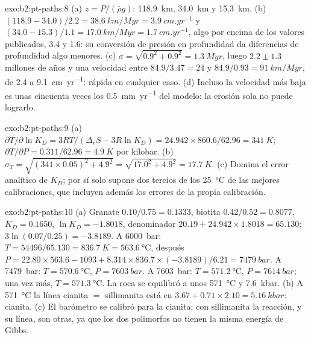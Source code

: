 \begin{solution}{exo:b2:pt-paths:8}
(a) $z = P/(\bar\rho g)$: \qty{118.9}{km}, \qty{34.0}{km} y \qty{15.3}{km}.
(b) $(118.9 - 34.0)/2.2 = \qty{38.6}{km/Myr} = \qty{3.9}{cm.yr^{-1}}$ y $(34.0 -
15.3)/1.1 = \qty{17.0}{km/Myr} = \qty{1.7}{cm.yr^{-1}}$, algo por encima de los valores publicados,
3.4 y 1.6: su conversión de presión en profundidad da diferencias de profundidad algo
menores. (c) $\sigma = \sqrt{0.9^2 + 0.9^2} = \qty{1.3}{Myr}$, luego $2.2 \pm 1.3$
millones de años y una velocidad entre $84.9/3.47 = 24$ y $84.9/0.93 = \qty{91}{km/Myr}$,
de 2.4 a \qty{9.1}{cm.yr^{-1}}: rápida en cualquier caso. (d) Incluso la velocidad más baja es unas cincuenta veces
los \qty{0.5}{mm.yr^{-1}} del modelo: la erosión sola no puede lograrlo.
\end{solution}

\begin{solution}{exo:b2:pt-paths:9}
(a) $\partial T/\partial\ln K_D = 3RT/(\Delta_r S - 3R\ln K_D) = 24.942\times860.6/62.96 =
\qty{341}{K}$; $\partial T/\partial P = 0.311/62.96 = \qty{4.9}{K}$ por kilobar.
(b) $\sigma_T = \sqrt{(341\times0.05)^2 + 4.9^2} = \sqrt{17.0^2 + 4.9^2} =
\qty{17.7}{K}$. (c) Domina el error analítico de $K_D$; por sí solo supone dos tercios de
los \qty{25}{\celsius} de las mejores calibraciones, que incluyen además los errores de la
propia calibración.
\end{solution}

\begin{solution}{exo:b2:pt-paths:10}
(a) Granate $0.10/0.75 = 0.1333$, biotita $0.42/0.52 = 0.8077$, $K_D = 0.1650$, $\ln K_D =
-1.8018$, denominador $20.19 + 24.942\times1.8018 = 65.130$; $3\ln(0.07/0.25) = -3.8189$.
A \qty{6000}{bar}: $T = 54496/65.130 = \qty{836.7}{K} = \qty{563.6}{\celsius}$, después $P
= 22.80\times563.6 - 1093 + 8.314\times836.7\times(-3.8189)/6.21 = \qty{7479}{bar}$.
A \qty{7479}{bar}: $T = \qty{570.6}{\celsius}$, $P = \qty{7603}{bar}$. A
\qty{7603}{bar}: $T = \qty{571.2}{\celsius}$, $P = \qty{7614}{bar}$; una vez más, $T =
\qty{571.3}{\celsius}$. La roca se equilibró a unos \qty{571}{\celsius} y
\qty{7.6}{kbar}. (b) A \qty{571}{\celsius} la línea cianita $=$ sillimanita está en $3.67
+ 0.71\times2.10 = \qty{5.16}{kbar}$: cianita. (c) El barómetro se calibró para la
cianita; con sillimanita la reacción, y su línea, son otras, ya que los dos polimorfos no
tienen la misma energía de Gibbs.
\end{solution}

